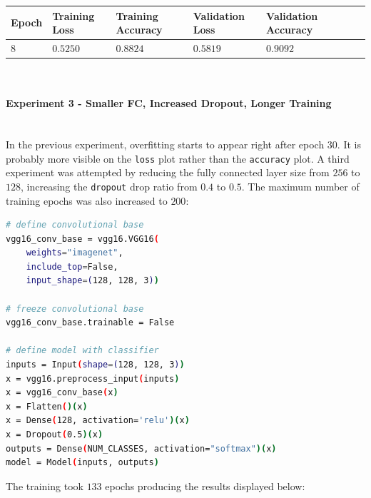 \documentclass[11pt,a4paper]{article}
\begin{document}
\begin{center}
\hspace*{-0.8cm}
\begin{tabular}{|p{1.2cm}|p{1.8cm}|p{2cm}|p{2cm}|p{2cm}|p{2cm}|p{2cm}|}
\rowcolor{gray!50}
\hline
\textbf{Epoch} & \textbf{Training Loss} & \textbf{Training Accuracy} & \textbf{Validation Loss} & \textbf{Validation Accuracy}\\
\hline
$8$ & $0.5250$ & $0.8824$ & $0.5819$ & $0.9092$\\
\hline
\end{tabular}\\
\end{center}
\paragraph{Experiment 3 - Smaller FC, Increased Dropout, Longer Training}\mbox{}\\
In the previous experiment, overfitting starts to appear right after epoch $30$. It is probably more visible on the \texttt{loss} plot rather than the \texttt{accuracy} plot. A third experiment was attempted by reducing the fully connected layer size from $256$ to $128$, increasing the \texttt{dropout} drop ratio from $0.4$ to $0.5$. The maximum number of training epochs was also increased to $200$:
\begin{lstlisting}[language=bash,frame=single]
# define convolutional base
vgg16_conv_base = vgg16.VGG16(
    weights="imagenet",
    include_top=False,
    input_shape=(128, 128, 3))

# freeze convolutional base
vgg16_conv_base.trainable = False

# define model with classifier
inputs = Input(shape=(128, 128, 3))
x = vgg16.preprocess_input(inputs)
x = vgg16_conv_base(x)
x = Flatten()(x)
x = Dense(128, activation='relu')(x)
x = Dropout(0.5)(x)
outputs = Dense(NUM_CLASSES, activation="softmax")(x)
model = Model(inputs, outputs)
\end{lstlisting}
The training took $133$ epochs producing the results displayed below:
\end{document}
